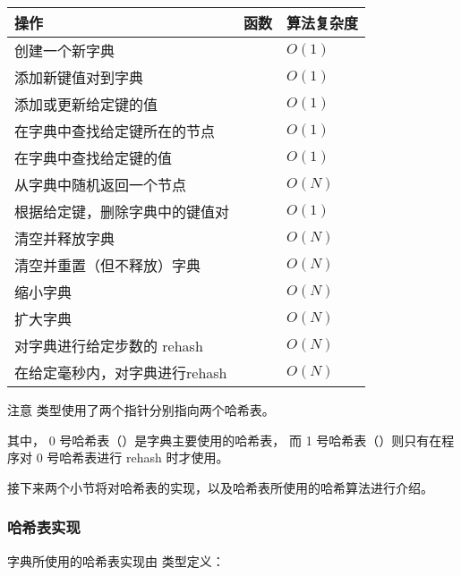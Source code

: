\documentclass[a4paper,11pt,english]{sphinxmanual}
\begin{document}
\begin{tabulary}{\linewidth}{|L|L|L|}
\hline
\textbf{
操作
} & \textbf{
函数
} & \textbf{
算法复杂度
}\\\hline

创建一个新字典
 & 
 & 
$O(1)$
\\\hline

添加新键值对到字典
 & 
 & 
$O(1)$
\\\hline

添加或更新给定键的值
 & 
 & 
$O(1)$
\\\hline

在字典中查找给定键所在的节点
 & 
 & 
$O(1)$
\\\hline

在字典中查找给定键的值
 & 
 & 
$O(1)$
\\\hline

从字典中随机返回一个节点
 & 
 & 
$O(N)$
\\\hline

根据给定键，删除字典中的键值对
 & 
 & 
$O(1)$
\\\hline

清空并释放字典
 & 
 & 
$O(N)$
\\\hline

清空并重置（但不释放）字典
 & 
 & 
$O(N)$
\\\hline

缩小字典
 & 
 & 
$O(N)$
\\\hline

扩大字典
 & 
 & 
$O(N)$
\\\hline

对字典进行给定步数的 rehash
 & 
 & 
$O(N)$
\\\hline

在给定毫秒内，对字典进行rehash
 & 
 & 
$O(N)$
\\\hline
\end{tabulary}

注意  类型使用了两个指针分别指向两个哈希表。

其中，
0 号哈希表（）是字典主要使用的哈希表，
而 1 号哈希表（）则只有在程序对 0 号哈希表进行 rehash 时才使用。

接下来两个小节将对哈希表的实现，以及哈希表所使用的哈希算法进行介绍。


\subsubsection{哈希表实现}
\label{internal-datastruct/dict:id5}
字典所使用的哈希表实现由  类型定义：
\end{document}
